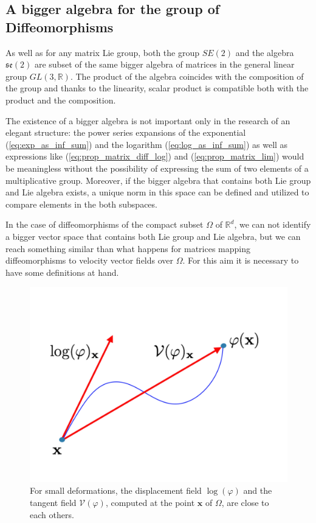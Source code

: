 \subsection{A bigger algebra for the group of Diffeomorphisms}\label{subse:bigger_algebra}
As well as for any matrix Lie group, both the group $SE(2)$ and the algebra $\mathfrak{se}(2)$ are subset of the same bigger algebra of matrices in the general linear group $GL(3,\mathbb{R})$. The product of the algebra coincides with the composition of the group and thanks to the linearity, scalar product is compatible both with the product and the composition.

The existence of a bigger algebra is not important only in the research of an elegant structure: the power series expansions of the exponential (\ref{eq:exp_as_inf_sum}) and the logarithm (\ref{eq:log_as_inf_sum}) as well as expressions like (\ref{eq:prop_matrix_diff_log}) and (\ref{eq:prop_matrix_lim}) would be meaningless without the possibility of expressing the sum of two elements of a multiplicative group. Moreover, if the bigger algebra that contains both Lie group and Lie algebra exists, a unique norm in this space can be defined and utilized to compare elements in the both subspaces.

In the case of diffeomorphisms of the compact subset $\Omega$ of $\mathbb{R}^d$, we can not identify a bigger vector space that contains both Lie group and Lie algebra, but we can reach something similar than what happens for matrices mapping diffeomorphisms to velocity vector fields over $\Omega$. For this aim it is necessary to have some definitions at hand.

\begin{figure}[!ht]
	\centering
	\includegraphics[scale=0.25]{figures/exp_versus_v.pdf}
	\caption{For small deformations, the displacement field $\log(\varphi)$ and the tangent field $\mathcal{V}(\varphi)$, computed at the point $\mathbf{x}$ of $\Omega$, are close to each others.}
	\label{fig:exp_versus_v}
\end{figure}

